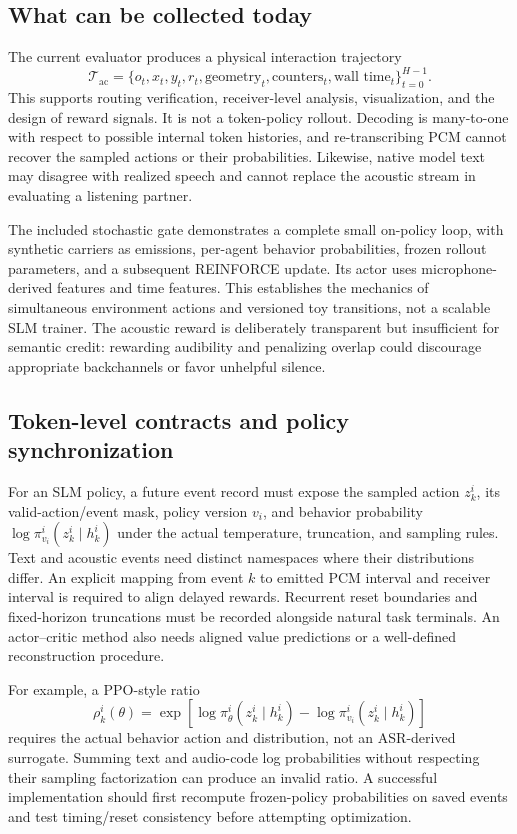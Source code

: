 \documentclass{article}
\begin{document}
\subsection{What can be collected today}
The current evaluator produces a physical interaction trajectory
\begin{equation}
 \mathcal T_{\mathrm{ac}}=\{o_t,x_t,y_t,r_t,\text{geometry}_t,\text{counters}_t,\text{wall time}_t\}_{t=0}^{H-1}.
\end{equation}
This supports routing verification, receiver-level analysis, visualization, and the design of reward signals. It is not a token-policy rollout. Decoding is many-to-one with respect to possible internal token histories, and re-transcribing PCM cannot recover the sampled actions or their probabilities. Likewise, native model text may disagree with realized speech and cannot replace the acoustic stream in evaluating a listening partner.

The included stochastic gate demonstrates a complete small on-policy loop, with synthetic carriers as emissions, per-agent behavior probabilities, frozen rollout parameters, and a subsequent REINFORCE update. Its actor uses microphone-derived features and time features. This establishes the mechanics of simultaneous environment actions and versioned toy transitions, not a scalable SLM trainer. The acoustic reward is deliberately transparent but insufficient for semantic credit: rewarding audibility and penalizing overlap could discourage appropriate backchannels or favor unhelpful silence.

\subsection{Token-level contracts and policy synchronization}
For an SLM policy, a future event record must expose the sampled action $z^i_k$, its valid-action/event mask, policy version $v_i$, and behavior probability $\log\pi^{i}_{v_i}(z^i_k\mid h^i_k)$ under the actual temperature, truncation, and sampling rules. Text and acoustic events need distinct namespaces where their distributions differ. An explicit mapping from event $k$ to emitted PCM interval and receiver interval is required to align delayed rewards. Recurrent reset boundaries and fixed-horizon truncations must be recorded alongside natural task terminals. An actor--critic method also needs aligned value predictions or a well-defined reconstruction procedure.

For example, a PPO-style ratio \citep{schulman2017ppo}
\begin{equation}
 \rho^i_k(\theta)=\exp\!\left[\log\pi^i_\theta(z^i_k\mid h^i_k)-\log\pi^i_{v_i}(z^i_k\mid h^i_k)\right]
\end{equation}
requires the actual behavior action and distribution, not an ASR-derived surrogate. Summing text and audio-code log probabilities without respecting their sampling factorization can produce an invalid ratio. A successful implementation should first recompute frozen-policy probabilities on saved events and test timing/reset consistency before attempting optimization.
\end{document}
